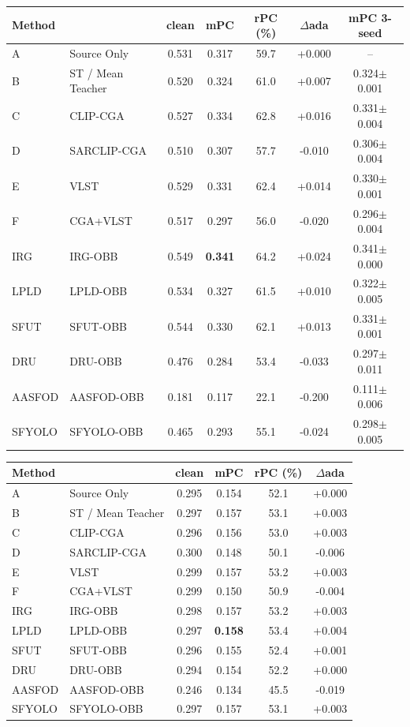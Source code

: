 \begin{tabular}{llccccc}
\toprule
Method & & clean & mPC & rPC (\%) & $\Delta$ada & mPC 3-seed \\
\midrule
A & Source Only & 0.531 & 0.317 & 59.7 & +0.000 & -- \\
B & ST / Mean Teacher & 0.520 & 0.324 & 61.0 & +0.007 & 0.324$\pm$0.001 \\
C & CLIP-CGA & 0.527 & 0.334 & 62.8 & +0.016 & 0.331$\pm$0.004 \\
D & SARCLIP-CGA & 0.510 & 0.307 & 57.7 & -0.010 & 0.306$\pm$0.004 \\
E & VLST & 0.529 & 0.331 & 62.4 & +0.014 & 0.330$\pm$0.001 \\
F & CGA+VLST & 0.517 & 0.297 & 56.0 & -0.020 & 0.296$\pm$0.004 \\
\midrule
IRG & IRG-OBB & 0.549 & \textbf{0.341} & 64.2 & +0.024 & 0.341$\pm$0.000 \\
LPLD & LPLD-OBB & 0.534 & 0.327 & 61.5 & +0.010 & 0.322$\pm$0.005 \\
SFUT & SFUT-OBB & 0.544 & 0.330 & 62.1 & +0.013 & 0.331$\pm$0.001 \\
DRU & DRU-OBB & 0.476 & 0.284 & 53.4 & -0.033 & 0.297$\pm$0.011 \\
AASFOD & AASFOD-OBB & 0.181 & 0.117 & 22.1 & -0.200 & 0.111$\pm$0.006 \\
SFYOLO & SFYOLO-OBB & 0.465 & 0.293 & 55.1 & -0.024 & 0.298$\pm$0.005 \\
\bottomrule
\end{tabular}

\begin{tabular}{llcccc}
\toprule
Method & & clean & mPC & rPC (\%) & $\Delta$ada \\
\midrule
A & Source Only & 0.295 & 0.154 & 52.1 & +0.000 \\
B & ST / Mean Teacher & 0.297 & 0.157 & 53.1 & +0.003 \\
C & CLIP-CGA & 0.296 & 0.156 & 53.0 & +0.003 \\
D & SARCLIP-CGA & 0.300 & 0.148 & 50.1 & -0.006 \\
E & VLST & 0.299 & 0.157 & 53.2 & +0.003 \\
F & CGA+VLST & 0.299 & 0.150 & 50.9 & -0.004 \\
\midrule
IRG & IRG-OBB & 0.298 & 0.157 & 53.2 & +0.003 \\
LPLD & LPLD-OBB & 0.297 & \textbf{0.158} & 53.4 & +0.004 \\
SFUT & SFUT-OBB & 0.296 & 0.155 & 52.4 & +0.001 \\
DRU & DRU-OBB & 0.294 & 0.154 & 52.2 & +0.000 \\
AASFOD & AASFOD-OBB & 0.246 & 0.134 & 45.5 & -0.019 \\
SFYOLO & SFYOLO-OBB & 0.297 & 0.157 & 53.1 & +0.003 \\
\bottomrule
\end{tabular}
